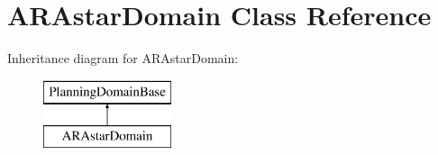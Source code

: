 \hypertarget{class_a_r_astar_domain}{\section{A\-R\-Astar\-Domain Class Reference}
\label{class_a_r_astar_domain}
}
Inheritance diagram for A\-R\-Astar\-Domain\-:\begin{figure}[H]
\begin{center}
\leavevmode
\includegraphics[height=2.000000cm]{class_a_r_astar_domain}
\end{center}
\end{figure}
